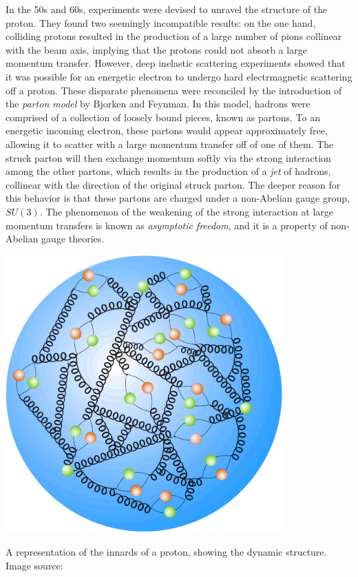 In the 50s and 60s, experiments were devised to unravel the structure of the proton. They found two seemingly incompatible results: on the one hand, colliding protons resulted in the production of a large number of pions collinear with the beam axis, implying that the protons could not absorb a large momentum transfer. However, deep inelastic scattering experiments showed that it was possible for an energetic electron to undergo hard electrmagnetic scattering off a proton. These disparate phenomena were reconciled by the introduction of the \emph{parton model} by Bjorken and Feynman. In this model, hadrons were comprised of a collection of loosely bound pieces, known as partons. To an energetic incoming electron, these partons would appear approximately free, allowing it to scatter with a large momentum transfer off of one of them. The struck parton will then exchange momentum softly via the strong interaction among the other partons, which results in the production of a \emph{jet} of hadrons, collinear with the direction of the original struck parton. The deeper reason for this behavior is that these partons are charged under a non-Abelian gauge group, $SU(3)$. The phenomenon of the weakening of the strong interaction at large momentum transfers is known as \emph{asymptotic freedom}, and it is a property of non-Abelian gauge theories.
\begin{marginfigure}[-3in]
  \strictpagecheck
  \includegraphics[width=0.8\textwidth]{images/proton_innards}
\caption{A representation of the innards of a proton, showing the dynamic structure. Image source:\citep{proton_structure}}
\end{marginfigure}
